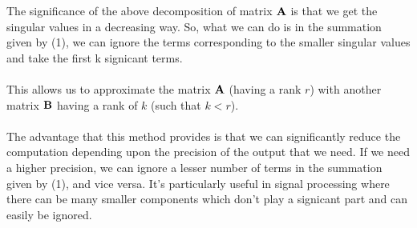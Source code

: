 \documentclass[12pt, a4paper]{article}
\begin{document}
The significance of the above decomposition of matrix $\textbf{A}$ is that we get the singular values in a decreasing way. So, what we can do is in the summation given by (1), we can  ignore the  terms corresponding to the smaller singular values and take the first k signicant terms.\\ \\
This allows us to approximate the matrix $\textbf{A}$ (having a rank $r$) with another matrix $\textbf{B}$ having a rank of $k$ (such that $k < r$). \\ \\
The advantage that this method provides is that we can significantly reduce the computation depending upon the precision of the output that we need. If we need a higher precision, we can ignore a lesser number of terms in the summation given by (1), and vice versa. It's particularly useful in signal processing where  there can be many smaller components which don't play a signicant part and can easily be ignored.
\newpage
\end{document}
